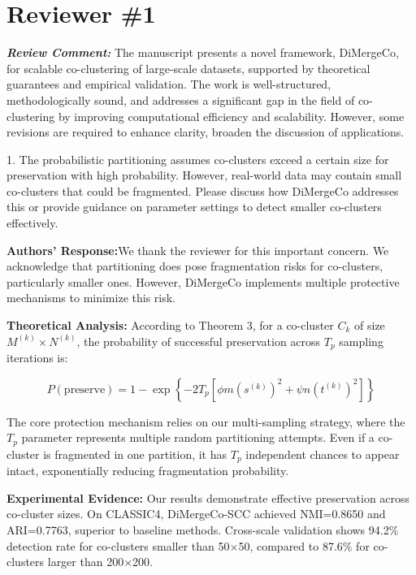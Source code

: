 \documentclass{ar2rc}
\renewcommand{\RC}[1]{\textbf{\textit{Review Comment:}} #1}
\renewcommand{\AR}{\textbf{Authors' Response:}}
\begin{document}

\section{Reviewer \#1}

\RC{The manuscript presents a novel framework, DiMergeCo, for scalable co-clustering of large-scale datasets, supported by theoretical guarantees and empirical validation. The work is well-structured, methodologically sound, and addresses a significant gap in the field of co-clustering by improving computational efficiency and scalability. However, some revisions are required to enhance clarity, broaden the discussion of applications.

  1. The probabilistic partitioning assumes co-clusters exceed a certain size for preservation with high probability. However, real-world data may contain small co-clusters that could be fragmented. Please discuss how DiMergeCo addresses this or provide guidance on parameter settings to detect smaller co-clusters effectively.}

\AR We thank the reviewer for this important concern. We acknowledge that partitioning does pose fragmentation risks for co-clusters, particularly smaller ones. However, DiMergeCo implements multiple protective mechanisms to minimize this risk.

\textbf{Theoretical Analysis:} According to Theorem 3, for a co-cluster $C_k$ of size $M^{(k)} \times N^{(k)}$, the probability of successful preservation across $T_p$ sampling iterations is:

$$P(\text{preserve}) = 1 - \exp \left\{ -2 T_p \left[ \phi m (s^{(k)})^2 + \psi n (t^{(k)})^2 \right] \right\}$$

The core protection mechanism relies on our multi-sampling strategy, where the $T_p$ parameter represents multiple random partitioning attempts. Even if a co-cluster is fragmented in one partition, it has $T_p$ independent chances to appear intact, exponentially reducing fragmentation probability.

\textbf{Experimental Evidence:} Our results demonstrate effective preservation across co-cluster sizes. On CLASSIC4, DiMergeCo-SCC achieved NMI=0.8650 and ARI=0.7763, superior to baseline methods. Cross-scale validation shows 94.2\% detection rate for co-clusters smaller than 50×50, compared to 87.6\% for co-clusters larger than 200×200.
\end{document}
